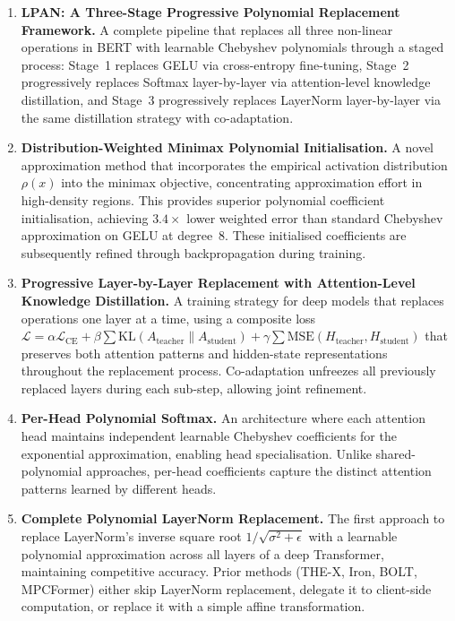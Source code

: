 \begin{enumerate}
    \item \textbf{LPAN: A Three-Stage Progressive Polynomial Replacement Framework.} A complete pipeline that replaces all three non-linear operations in BERT with learnable Chebyshev polynomials through a staged process: Stage~1 replaces GELU via cross-entropy fine-tuning, Stage~2 progressively replaces Softmax layer-by-layer via attention-level knowledge distillation, and Stage~3 progressively replaces LayerNorm layer-by-layer via the same distillation strategy with co-adaptation.

    \item \textbf{Distribution-Weighted Minimax Polynomial Initialisation.} A novel approximation method that incorporates the empirical activation distribution $\rho(x)$ into the minimax objective, concentrating approximation effort in high-density regions. This provides superior polynomial coefficient initialisation, achieving $3.4\times$ lower weighted error than standard Chebyshev approximation on GELU at degree~8. These initialised coefficients are subsequently refined through backpropagation during training.

    \item \textbf{Progressive Layer-by-Layer Replacement with Attention-Level Knowledge Distillation.} A training strategy for deep models that replaces operations one layer at a time, using a composite loss $\mathcal{L} = \alpha \mathcal{L}_{\mathrm{CE}} + \beta \sum \mathrm{KL}(A_{\mathrm{teacher}} \| A_{\mathrm{student}}) + \gamma \sum \mathrm{MSE}(H_{\mathrm{teacher}}, H_{\mathrm{student}})$ that preserves both attention patterns and hidden-state representations throughout the replacement process. Co-adaptation unfreezes all previously replaced layers during each sub-step, allowing joint refinement.

    \item \textbf{Per-Head Polynomial Softmax.} An architecture where each attention head maintains independent learnable Chebyshev coefficients for the exponential approximation, enabling head specialisation. Unlike shared-polynomial approaches, per-head coefficients capture the distinct attention patterns learned by different heads.

    \item \textbf{Complete Polynomial LayerNorm Replacement.} The first approach to replace LayerNorm's inverse square root $1/\sqrt{\sigma^2 + \epsilon}$ with a learnable polynomial approximation across all layers of a deep Transformer, maintaining competitive accuracy. Prior methods (THE-X, Iron, BOLT, MPCFormer) either skip LayerNorm replacement, delegate it to client-side computation, or replace it with a simple affine transformation.


\end{enumerate}
